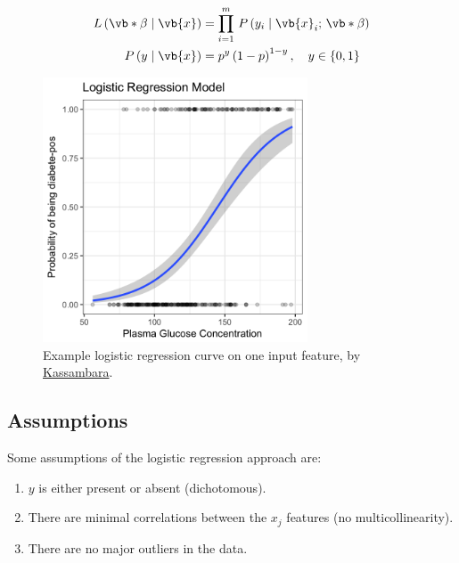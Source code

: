 \begin{subequations} \label{eq:logistic:L_Pr}
\begin{align}
L\left(\vb*{\beta} \mid \vb{x}\right) &= \prod_{i=1}^{m} \, P\left(y_{i} \mid \vb{x}_{i};\,\vb*{\beta}\right) \label{eq:logistic:L} \\
P\left(y \mid \vb{x}\right) &= p^y\left(1-p\right)^{1-y}, \quad y \in \{0, 1\} \label{eq:logistic:Pr}
\end{align}
\end{subequations}

\begin{figure}
\centering
\includegraphics[width=0.7\textwidth]{figures/regression/logistic-regression-probabilities-curve.png}
\caption{
Example logistic regression curve on one input feature, by \href{http://www.sthda.com/english/articles/36-classification-methods-essentials/151-logistic-regression-essentials-in-r/}{Kassambara}.
}
\label{fig:logistic_regression_ex}
\end{figure}

\subsection{Assumptions}
\label{class:logistic:assumptions}

Some assumptions of the logistic regression approach are:
\begin{enumerate}[noitemsep]
  \item $y$ is either present or absent (dichotomous).
  \item There are minimal correlations between the $x_{j}$ features (no multicollinearity).
  \item There are no major outliers in the data.
\end{enumerate}

